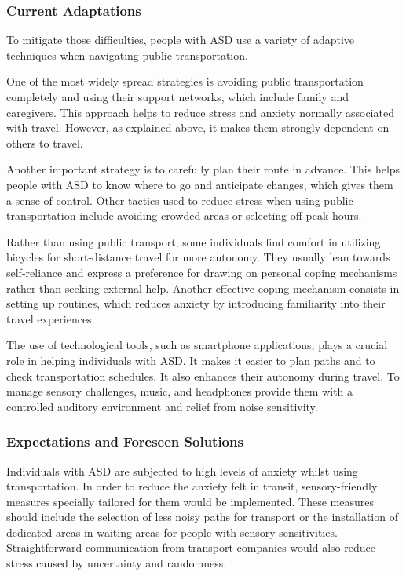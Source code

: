 \subsubsection{Current Adaptations}

To mitigate those difficulties, people with ASD use a variety of adaptive techniques when navigating public transportation.

One of the most widely spread strategies is avoiding public transportation completely and using their support networks, which include family and caregivers\cite{2015DetourRightPlace}. This approach helps to reduce stress and anxiety normally associated with travel. However, as explained above, it makes them strongly dependent on others to travel.

Another important strategy is to carefully plan their route in advance\cite{2020ExperiencesYoungAutistic}. This helps people with ASD to know where to go and anticipate changes, which gives them a sense of control. Other tactics used to reduce stress when using public transportation include avoiding crowded areas or selecting off-peak hours.

Rather than using public transport, some individuals find comfort in utilizing bicycles for short-distance travel\cite{2015ViewpointsAdultsAutism} for more autonomy. They usually lean towards self-reliance and express a preference for drawing on personal coping mechanisms rather than seeking external help. Another effective coping mechanism consists in setting up routines\cite{2015ViewpointsAdultsAutism}, which reduces anxiety by introducing familiarity into their travel experiences.

The use of technological tools, such as smartphone applications, plays a crucial role in helping individuals with ASD. It makes it easier to plan paths and to check transportation schedules. It also enhances their autonomy during travel. To manage sensory challenges, music, and headphones provide them with a controlled auditory environment and relief from noise sensitivity\cite{2020ExperiencesYoungAutistic}.

\subsubsection{Expectations and Foreseen Solutions}

Individuals with ASD are subjected to high levels of anxiety whilst using transportation. In order to reduce the anxiety felt in transit, sensory-friendly measures specially tailored for them would be implemented\cite{2020ExperiencesYoungAutistic}. These measures should include the selection of less noisy paths for transport or the installation of dedicated areas in waiting areas for people with sensory sensitivities. Straightforward communication from transport companies would also reduce stress caused by uncertainty and randomness.

